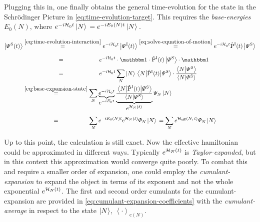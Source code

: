 Plugging this in, one finally obtains the general time-evolution for the state in the Schrödinger Picture in \autoref{eq:time-evolution-target}.
This requires the \emph{base-energies} $E_0(N)$, where $e^{-i \mathcal{H}_0^{}{} t}\ket{N}{} = e^{-i E_0(N) t}\ket{N}{}$.

\begin{equation}
    \label{eq:time-evolution-target}
    \begin{split}
        \ketpsiof[\schroedingerPicture]{t} &\stackrel{\ref{eq:time-evolution-interaction}}{=} e^{-i \HzeroHamiltonian{} t} \ketpsiof[\interactionPicture]{t} 
        \stackrel{\ref{eq:solve-equation-of-motion}}{=}
        e^{-i \HzeroHamiltonian{} t} \timeEvolutionOperator[\interactionPicture] \ketpsi[\schroedingerPicture]{} \\
        &\stackrel{\phantom{\ref{eq:solve-equation-of-motion}}}{=}
        e^{-i \HzeroHamiltonian{} t} \cdot \one \cdot  \timeEvolutionOperator[\interactionPicture] \ketpsi[\schroedingerPicture]{}\cdot \one\\
        &\stackrel{\phantom{\ref{eq:solve-equation-of-motion}}}{=}
        e^{-i \HzeroHamiltonian{} t} \lsum[N] \ketN{} \bracketHelper{N}{\timeEvolutionOperator[\interactionPicture]}{\picturePsi[\schroedingerPicture]{}} \cdot \frac{\braketHelper{N}{\picturePsi[\schroedingerPicture]{}}}{\braketHelper{N}{\picturePsi[\schroedingerPicture]{}}}\\
        &\stackrel{\ref{eq:base-expansion-state}}{=}
        \lsum[N] \underbrace{e^{-i \HzeroHamiltonian{} t}}_{\text{\normalsize{$e^{-i E_0 t}$}}}  \underbrace{\frac{\bracketHelper{N}{\timeEvolutionOperator[\interactionPicture]}{\picturePsi[\schroedingerPicture]{}}}{\braketHelper{N}{\picturePsi[\schroedingerPicture]{}}}}_{\text{\normalsize{$e^{\HNOft}$}}}  \psiN \ketN{}\\
        &\stackrel{\phantom{\ref{eq:base-expansion-state}}}{=}
        \lsum[N] e^{-i E_0(N) t}  e^{\HNOft} \psiN \ketN{} = 
        \lsum[N] e^{\HeffOft} \psiN \ketN{}
    \end{split}
\end{equation}

Up to this point, the calculation is still exact. Now the effective hamiltonian \HNOft could be approximated in different ways. Typically $e^{\mathcal{H}_{N}(t)}$ is \emph{Taylor-expanded}, but in this context this approximation would converge quite poorly. 
To combat this and require a smaller order of expansion, one could employ the \emph{cumulant-expansion} \cite{cumulantExpansionOriginalDerivation} to expand the object in terms of its exponent \HNOft and not the whole exponential $e^{\mathcal{H}_{N}(t)}$.
The first and second order cumulants for the cumulant-expansion are provided in \autoref{eq:cumulant-expansion-coefficients} \cite{variationalClassicalNetworksPaper} with the \emph{cumulant-average} in respect to the state $\ket{N}$, $\left\langle\cdot\right\rangle_{\text{c}(N)}$.

